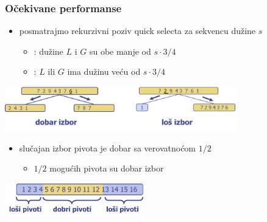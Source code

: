 \documentclass[compress,aspectratio=169]{beamer}
\begin{document}
\begin{frame}[fragile]
  \frametitle{Očekivane performanse}
  \begin{itemize}
    \item posmatrajmo rekurzivni poziv quick selecta za sekvencu dužine $s$
    \begin{itemize}
      \item {}: dužine $L$ i $G$ su obe manje od $s\cdot 3/4$
      \item {}: $L$ ili $G$ ima dužinu veću od $s\cdot 3/4$
    \end{itemize}
  \end{itemize}
  \begin{center}
    \includegraphics[width=10cm]{asp-12-pic38.png}
  \end{center}
  \begin{itemize}
    \item slučajan izbor pivota je dobar sa verovatnoćom $1/2$
    \begin{itemize}
      \item $1/2$ mogućih pivota su dobar izbor
    \end{itemize}
  \end{itemize}
  \begin{center}
    \includegraphics[width=6cm]{asp-12-pic39.png}
  \end{center}
\end{frame}
\end{document}
